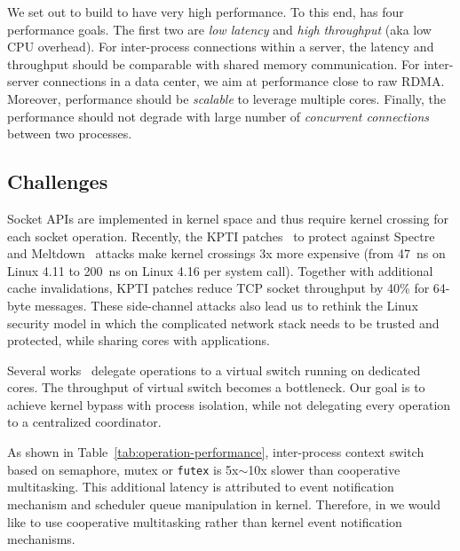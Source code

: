 We set out to build \sys{} to have very high performance. To this end, \sys has four performance goals. The first two are \textit{low latency} and \textit{high throughput} (aka low CPU overhead). For inter-process connections within a server, the latency and throughput should be comparable with shared memory communication. For inter-server connections in a data center, we aim at performance close to raw RDMA. Moreover, performance should be \textit{scalable} to leverage multiple cores. Finally, the performance should not degrade with large number of \textit{concurrent connections} between two processes. 



\subsection{Challenges}
\label{subsec:challenges}

Socket APIs are implemented in kernel space and thus require kernel crossing for each socket operation. Recently, the KPTI patches~\cite{kpti} to protect against Spectre~\cite{Kocher2018spectre} and Meltdown~\cite{Lipp2018meltdown} attacks make kernel crossings 3x more expensive (from 47~ns on Linux 4.11 to 200~ns on Linux 4.16 per system call). Together with additional cache invalidations, KPTI patches reduce TCP socket throughput by 40\% for 64-byte messages. These side-channel attacks also lead us to rethink the Linux security model in which the complicated network stack needs to be trusted and protected, while sharing cores with applications.

Several works~\cite{martins2014clickos,roghanchi2017ffwd,huang2017high} delegate operations to a virtual switch running on dedicated cores. The throughput of virtual switch becomes a bottleneck. Our goal is to achieve kernel bypass with process isolation, while not delegating every operation to a centralized coordinator.

As shown in Table~\ref{tab:operation-performance}, inter-process context switch based on semaphore, mutex or \texttt{futex} is 5x$\sim$10x slower than cooperative multitasking. This additional latency is attributed to event notification mechanism and scheduler queue manipulation in kernel. %
Therefore, in \sys we would like to use cooperative multitasking rather than kernel event notification mechanisms.

